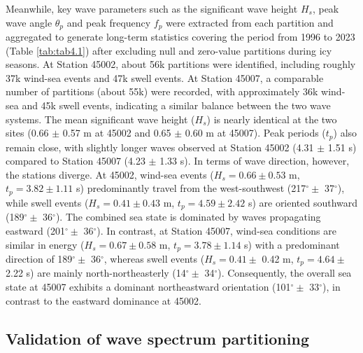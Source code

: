 Meanwhile, key wave parameters such as the significant wave height $H_s$, peak
wave angle $\theta_p$ and peak frequency $f_p$ were extracted from each
partition and aggregated to generate long-term statistics covering the period
from 1996 to 2023 (Table \ref{tab:tab4.1}) after excluding null and zero-value
partitions during icy seasons. At Station 45002, about 56k partitions were
identified, including roughly 37k wind-sea events and 47k swell events.  At
Station 45007, a comparable number of partitions (about 55k) were recorded, with
approximately 36k wind-sea and 45k swell events, indicating a similar balance
between the two wave systems. The mean significant wave height ($H_s$) is nearly
identical at the two sites (0.66 $\pm$ 0.57 m at 45002 and 0.65 $\pm$ 0.60 m at
45007). Peak periods ($t_p$) also remain close, with slightly longer waves
observed at Station 45002 (4.31 $\pm$ 1.51 s) compared to Station 45007 (4.23
$\pm$ 1.33 s). In terms of wave direction, however, the stations diverge. At
45002, wind-sea events ($H_s = 0.66 \pm 0.53$ m, $t_p = 3.82 \pm 1.11$ s)
predominantly travel from the west-southwest (217$^\circ \pm$ 37$^\circ$), while
swell events ($H_s = 0.41 \pm 0.43$ m, $t_p = 4.59 \pm 2.42$ s) are oriented
southward (189$^\circ \pm$ 36$^\circ$). The combined sea state is dominated by
waves propagating eastward (201$^\circ \pm$ 36$^\circ$). In contrast, at Station
45007, wind-sea conditions are similar in energy ($H_s = 0.67 \pm 0.58$ m, $t_p
= 3.78 \pm 1.14$ s) with a predominant direction of 189$^\circ \pm$ 36$^\circ$, 
whereas swell events ($H_s = 0.41 \pm$ 0.42 m, $t_p = 4.64 \pm$ 2.22 s) are
mainly north-northeasterly (14$^\circ \pm$ 34$^\circ$). Consequently, the
overall sea state at 45007 exhibits a dominant northeastward orientation 
(101$^\circ \pm$ 33$^\circ$), in contrast to the eastward dominance at 45002.






\subsection{Validation of wave spectrum partitioning}
\label{Validation of wave spectrum partitioning}

